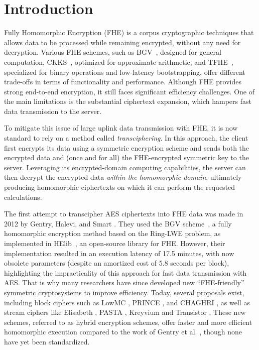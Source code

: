 \section{Introduction}
\label{sec:introduction}
Fully Homomorphic Encryption (FHE) is a corpus cryptographic techniques that allows data to be processed while remaining encrypted, without any need for decryption. Various FHE schemes, such as BGV~\cite{ITCS:BraGenVai12}, designed for general computation, CKKS~\cite{AC:CKKS17}, optimized for approximate arithmetic, and TFHE~\cite{AC:CGGI16,JC:CGGI20}, specialized for binary operations and low-latency bootstrapping, offer different trade-offs in terms of functionality and performance. Although FHE provides strong end-to-end encryption, it still faces significant efficiency challenges. One of the main limitations is the substantial ciphertext expansion, which hampers fast data transmission to the server.

To mitigate this issue of large uplink data transmission with FHE, it is now standard to rely on a method called \emph{transciphering}. In this approach, the client first encrypts its data using a symmetric encryption scheme and sends both the encrypted data and (once and for all) the FHE-encrypted symmetric key to the server. Leveraging its encrypted-domain computing capabilities, the server can then decrypt the encrypted data \emph{within the homomorphic domain}, ultimately producing homomorphic ciphertexts on which it can perform the requested calculations.

The first attempt to transcipher AES ciphertexts into FHE data was made in 2012 by Gentry, Halevi, and Smart \cite{gentry_BGV}. They used the BGV scheme~\cite{ITCS:BraGenVai12}, a fully homomorphic encryption method based on the Ring-LWE problem, as implemented in HElib~\cite{EPRINT:HalSho20}, an open-source library for FHE. However, their implementation resulted in an execution latency of 17.5 minutes, with now obsolete parameters (despite an amortized cost of 5.8 seconds per block), highlighting the impracticality of this approach for fast data transmission with AES. That is why many researchers have since developed new ``FHE-friendly'' symmetric cryptosystems to improve efficiency.
%
Today, several proposals exist, including block ciphers such as LowMC \cite{lowMC}, PRINCE \cite{PRINCE}, and CHAGHRI \cite{Chaghri}, as well as stream ciphers like Elisabeth \cite{Elisabeth}, PASTA \cite{pasta}, Kreyvium \cite{kreyvium} and Transistor \cite{transistor}. These new schemes, referred to as hybrid encryption schemes, offer faster and more efficient homomorphic execution compared to the work of Gentry et al. \cite{gentry_BGV}, though none have yet been standardized.

